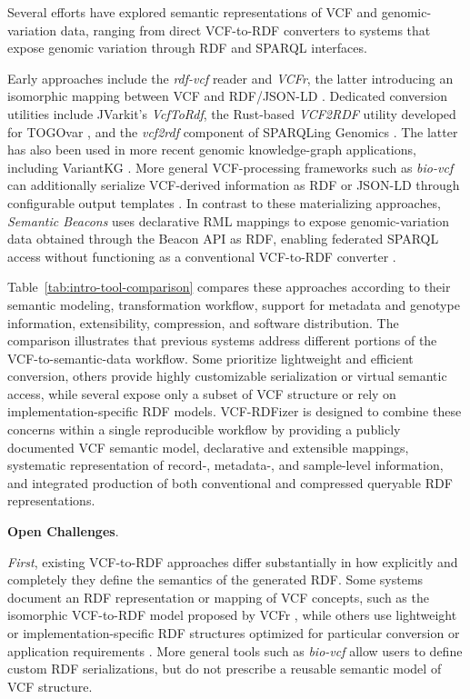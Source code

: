 \documentclass[pdflatex,sn-mathphys-num]{sn-jnl}%
\theoremstyle{thmstyleone}%
\theoremstyle{thmstyletwo}%
\theoremstyle{thmstylethree}%
\begin{document}
Several efforts have explored semantic representations of VCF and genomic-variation data, ranging from direct VCF-to-RDF converters to systems that expose genomic variation through RDF and SPARQL interfaces.

Early approaches include the \textit{rdf-vcf} reader and \textit{VCFr}, the latter introducing an isomorphic mapping between VCF and RDF/JSON-LD \cite{ruby_rdf_vcf,vcfr_2017}.
Dedicated conversion utilities include JVarkit's \textit{VcfToRdf}, the Rust-based \textit{VCF2RDF} utility developed for TOGOvar \cite{JVarkit_2015,togovar_2022}, and the \textit{vcf2rdf} component of SPARQLing Genomics \cite{sparqling_genomics_2020,sparqling_genomics_software}.
The latter has also been used in more recent genomic knowledge-graph applications, including VariantKG \cite{variantkg_2025}.
More general VCF-processing frameworks such as \textit{bio-vcf} can additionally serialize VCF-derived information as RDF or JSON-LD through configurable output templates \cite{bio_vcf}.
In contrast to these materializing approaches, \textit{Semantic Beacons} uses declarative RML mappings to expose genomic-variation data obtained through the Beacon API as RDF, enabling federated SPARQL access without functioning as a conventional VCF-to-RDF converter \cite{semantic_beac_2025}.

Table~\ref{tab:intro-tool-comparison} compares these approaches according to their semantic modeling, transformation workflow, support for metadata and genotype information, extensibility, compression, and software distribution.
The comparison illustrates that previous systems address different portions of the VCF-to-semantic-data workflow.
Some prioritize lightweight and efficient conversion, others provide highly customizable serialization or virtual semantic access, while several expose only a subset of VCF structure or rely on implementation-specific RDF models.
VCF-RDFizer is designed to combine these concerns within a single reproducible workflow by providing a publicly documented VCF semantic model, declarative and extensible mappings, systematic representation of record-, metadata-, and sample-level information, and integrated production of both conventional and compressed queryable RDF representations.



\textbf{Open Challenges}.

\textit{First}, existing VCF-to-RDF approaches differ substantially in how explicitly and completely they define the semantics of the generated RDF.
Some systems document an RDF representation or mapping of VCF concepts, such as the isomorphic VCF-to-RDF model proposed by VCFr \cite{vcfr_2017}, while others use lightweight or implementation-specific RDF structures optimized for particular conversion or application requirements \cite{togovar_2022,JVarkit_2015}.
More general tools such as \textit{bio-vcf} allow users to define custom RDF serializations, but do not prescribe a reusable semantic model of VCF structure.
\end{document}
